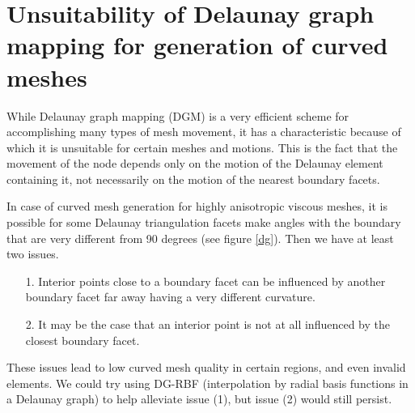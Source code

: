 \documentclass{article}
\begin{document}
\section*{\centering Unsuitability of Delaunay graph mapping for generation of curved meshes}	
While Delaunay graph mapping (DGM) is a very efficient scheme for accomplishing many types of mesh movement, it has a characteristic because of which it is unsuitable for certain meshes and motions. This is the fact that the movement of the node depends only on the motion of the Delaunay element containing it, not necessarily on the motion of the nearest boundary facets.

In case of curved mesh generation for highly anisotropic viscous meshes, it is possible for some Delaunay triangulation facets make angles with the boundary that are very different from 90 degrees (see figure \ref{dg}). Then we have at least two issues.
\begin{itemize}
\item[1.] Interior points close to a boundary facet can be influenced by another boundary facet far away having a very different curvature.
\item[2.] It may be the case that an interior point is not at all influenced by the closest boundary facet.
\end{itemize}
These issues lead to low curved mesh quality in certain regions, and even invalid elements. We could try using DG-RBF (interpolation by radial basis functions in a Delaunay graph) to help alleviate issue (1), but issue (2) would still persist.
\end{document}
